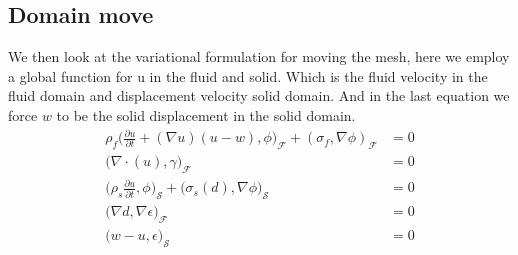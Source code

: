 \subsection*{Domain move}

We then look at the variational formulation for moving the mesh, here we employ a global function for u in the fluid and solid. Which is the fluid velocity in the fluid domain and displacement velocity solid domain. And in the last equation we force $w$ to be the solid displacement in the solid domain.
\begin{align*}
\rho_f \big( \frac{\partial u}{\partial t} + (\nabla u)(u-w) , \phi\big)_{\mathcal{F}} + (\sigma_f ,\nabla \phi )_{\mathcal{F}} &= 0  \\
 \big( \nabla \cdot (u ),\gamma \big)_{\mathcal{F}} &= 0 \\
\big(\rho_s \frac{\partial u}{\partial t},\phi \big)_{\mathcal{S}} + \big( \sigma_s(d), \nabla \phi \big)_{\mathcal{S}} &=0 \\
 \big( \nabla d , \nabla \epsilon \big)_{\mathcal{F}} &= 0 \\
 \big( w- u,\epsilon \big)_{\mathcal{S}} &= 0 \\
\end{align*}







